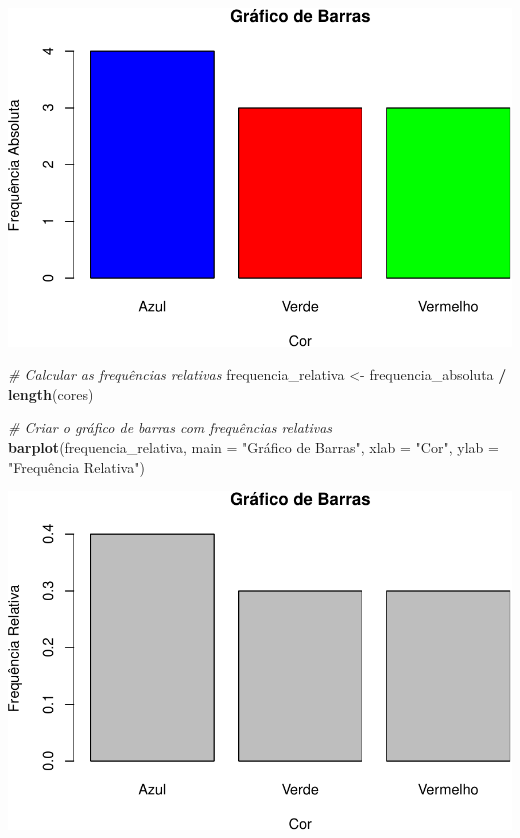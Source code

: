 \documentclass[
]{book}
\newenvironment{Shaded}{\begin{snugshade}}{\end{snugshade}}
\newcommand{\AttributeTok}[1]{\textcolor[rgb]{0.13,0.29,0.53}{#1}}
\newcommand{\CommentTok}[1]{\textcolor[rgb]{0.56,0.35,0.01}{\textit{#1}}}
\newcommand{\FunctionTok}[1]{\textcolor[rgb]{0.13,0.29,0.53}{\textbf{#1}}}
\newcommand{\NormalTok}[1]{#1}
\newcommand{\OtherTok}[1]{\textcolor[rgb]{0.56,0.35,0.01}{#1}}
\newcommand{\SpecialCharTok}[1]{\textcolor[rgb]{0.81,0.36,0.00}{\textbf{#1}}}
\newcommand{\StringTok}[1]{\textcolor[rgb]{0.31,0.60,0.02}{#1}}
\begin{document}
\includegraphics{meuLivro2_files/figure-latex/unnamed-chunk-110-1.pdf}

\begin{Shaded}
\begin{Highlighting}[]
\CommentTok{\# Calcular as frequências relativas}
\NormalTok{frequencia\_relativa }\OtherTok{\textless{}{-}}\NormalTok{ frequencia\_absoluta }\SpecialCharTok{/} \FunctionTok{length}\NormalTok{(cores)  }
    
\CommentTok{\# Criar o gráfico de barras com frequências relativas}
\FunctionTok{barplot}\NormalTok{(frequencia\_relativa,         }
  \AttributeTok{main =} \StringTok{"Gráfico de Barras"}\NormalTok{,         }
  \AttributeTok{xlab =} \StringTok{"Cor"}\NormalTok{,         }
  \AttributeTok{ylab =} \StringTok{"Frequência Relativa"}\NormalTok{) }
\end{Highlighting}
\end{Shaded}

\includegraphics{meuLivro2_files/figure-latex/unnamed-chunk-111-1.pdf}
\end{document}
